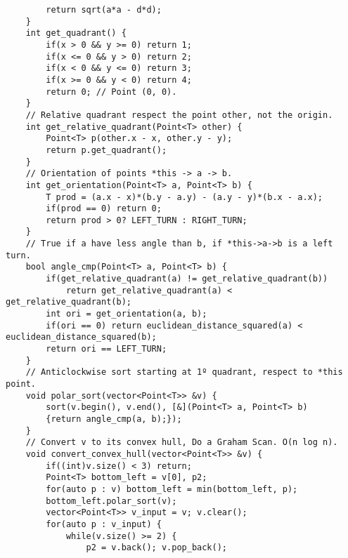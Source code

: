 \documentclass[a4paper]{article}
\begin{document}
\begin{multicols}{2}
\begin{verbatim}
        return sqrt(a*a - d*d);
    }
    int get_quadrant() {
        if(x > 0 && y >= 0) return 1;
        if(x <= 0 && y > 0) return 2;
        if(x < 0 && y <= 0) return 3;
        if(x >= 0 && y < 0) return 4;
        return 0; // Point (0, 0).
    }
    // Relative quadrant respect the point other, not the origin.
    int get_relative_quadrant(Point<T> other) {
        Point<T> p(other.x - x, other.y - y);
        return p.get_quadrant();
    }
    // Orientation of points *this -> a -> b.
    int get_orientation(Point<T> a, Point<T> b) {
        T prod = (a.x - x)*(b.y - a.y) - (a.y - y)*(b.x - a.x);
        if(prod == 0) return 0;
        return prod > 0? LEFT_TURN : RIGHT_TURN;
    }
    // True if a have less angle than b, if *this->a->b is a left turn.
    bool angle_cmp(Point<T> a, Point<T> b) {
        if(get_relative_quadrant(a) != get_relative_quadrant(b)) 
            return get_relative_quadrant(a) < get_relative_quadrant(b);
        int ori = get_orientation(a, b);
        if(ori == 0) return euclidean_distance_squared(a) < euclidean_distance_squared(b);
        return ori == LEFT_TURN;
    }
    // Anticlockwise sort starting at 1º quadrant, respect to *this point.
    void polar_sort(vector<Point<T>> &v) {
        sort(v.begin(), v.end(), [&](Point<T> a, Point<T> b) 
        {return angle_cmp(a, b);});
    }
    // Convert v to its convex hull, Do a Graham Scan. O(n log n).
    void convert_convex_hull(vector<Point<T>> &v) {
        if((int)v.size() < 3) return;
        Point<T> bottom_left = v[0], p2;
        for(auto p : v) bottom_left = min(bottom_left, p);
        bottom_left.polar_sort(v);
        vector<Point<T>> v_input = v; v.clear();
        for(auto p : v_input) {
            while(v.size() >= 2) {
                p2 = v.back(); v.pop_back();
                

\end{verbatim}
\end{multicols}
\end{document}
